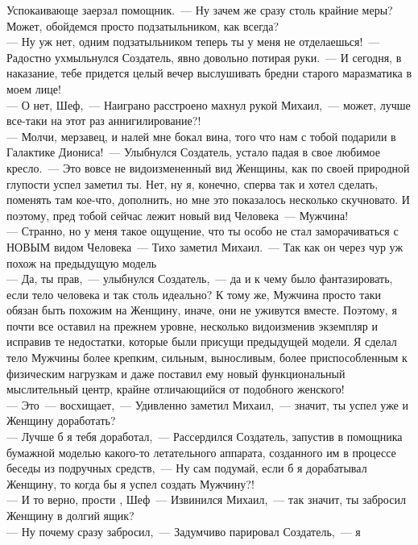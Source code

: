 Успокаивающе заерзал помощник.~--- Ну зачем же сразу столь крайние меры? 
Может, обойдемся просто подзатыльником, как всегда?\\ 
--- Ну уж нет, одним 
подзатыльником теперь ты у меня не отделаешься!~--- Радостно ухмыльнулся 
Создатель, явно довольно потирая руки.~--- И сегодня, в наказание, тебе 
придется целый вечер выслушивать бредни старого маразматика в моем 
лице!\\
--- О нет, Шеф,~--- Наиграно расстроено махнул рукой Михаил,~--- может, 
лучше все-таки на этот раз аннигилирование?!\\ --- Молчи, мерзавец, и налей 
мне бокал вина, того что нам с тобой подарили в Галактике Диониса!~--- 
Улыбнулся Создатель, устало падая в свое любимое кресло.~--- Это вовсе не 
видоизмененный вид Женщины, как по своей природной глупости успел 
заметил ты. Нет, ну я, конечно, сперва так и хотел сделать, поменять там
кое-что, дополнить, но мне это показалось несколько скучновато. И 
поэтому, пред тобой сейчас лежит новый вид Человека~--- Мужчина!\\
--- Странно, но у меня такое ощущение, что ты особо не стал 
заморачиваться с НОВЫМ видом Человека~--- Тихо заметил Михаил.~--- Так как 
он через чур уж похож на предыдущую модель\\
--- Да, ты прав,~--- улыбнулся 
Создатель,~--- да и к чему было фантазировать, если тело человека и так 
столь идеально? К тому же, Мужчина просто таки обязан быть похожим на 
Женщину, иначе, они не уживутся вместе. Поэтому, я почти все оставил на 
прежнем уровне, несколько видоизменив экземпляр и исправив те 
недостатки, которые были присущи предыдущей модели. Я сделал тело 
Мужчины более крепким, сильным, выносливым, более приспособленным к 
физическим нагрузкам и даже поставил ему новый функциональный 
мыслительный центр, крайне отличающийся от подобного женского!\\ 
--- Это~--- восхищает,~--- Удивленно заметил Михаил,~--- значит, ты успел уже и 
Женщину доработать?\\ 
--- Лучше б я тебя доработал,~--- Рассердился Создатель, 
запустив в помощника бумажной моделью какого-то летательного аппарата, 
созданного им в процессе беседы из подручных средств,~--- Ну сам подумай, 
если б я дорабатывал Женщину, то когда бы я успел создать Мужчину?!\\
--- И то верно, прости , Шеф~--- Извинился Михаил,~--- так значит, ты забросил 
Женщину в долгий ящик?\\
--- Ну почему сразу забросил,~--- Задумчиво парировал Создатель,~--- я 
